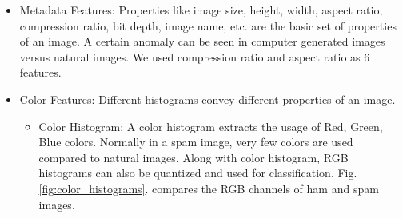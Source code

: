 \begin{itemize}
	\item Metadata Features: Properties like image size, height, width, aspect ratio, compression ratio, bit depth, image name, etc. are the basic set of properties of an image. A certain anomaly can be seen in computer generated images versus natural images. We used compression ratio and aspect ratio as 6 features.
	\item Color Features: Different histograms convey different properties of an image. 
	\begin{itemize}
		\item Color Histogram: A color histogram extracts the usage of Red, Green, Blue colors. Normally in a spam image, very few colors are used compared to natural images. Along with color histogram, RGB histograms can also be quantized and used for classification. Fig. \ref{fig:color_histograms}. compares the RGB channels of ham and spam images.
		
		 \begin{figure}[h]
		

\end{figure}
\end{itemize}
\end{itemize}
